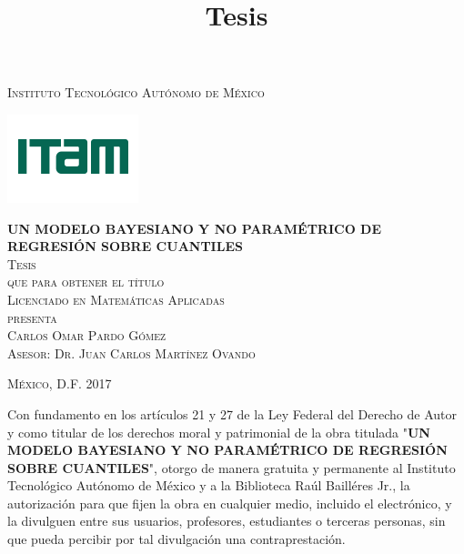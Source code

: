 \documentclass[letterpaper,onside,11pt,review]{report}
\begin{document}
\pagestyle{empty} %

\title{Tesis} %

\begin{titlepage}
\begin{center}

\textsc{\Large Instituto Tecnol\'ogico Aut\'onomo de M\'exico}\\[2em]

\begin{center}
	\includegraphics{DocumentosLaTex/ITAM_2016}
\end{center}

\vspace{1em}

{\sc \large {\bf UN MODELO BAYESIANO Y NO PARAM\'ETRICO DE REGRESI\'ON SOBRE CUANTILES}}\\[3em]

\textsc{\large Tesis}\\[1em]

\textsc{que para obtener el t\'itulo}\\[1em]

\textsc{Licenciado en Matem\'aticas Aplicadas}\\[1em]

\textsc{presenta}\\[1em]

\textsc{\Large Carlos Omar Pardo G\'omez}\\[1em]

\textsc{\large Asesor: Dr. Juan Carlos Mart\'inez Ovando}

\end{center}

\vspace*{\fill}
\textsc{M\'exico, D.F. \hspace*{\fill} 2017}

\end{titlepage}


\thispagestyle{empty}
\vspace*{\fill}
\begingroup
Con fundamento en los art\'iculos 21 y 27 de la Ley Federal del Derecho de Autor y como titular de los derechos moral y patrimonial de la obra titulada "\textbf{UN MODELO BAYESIANO Y NO PARAM\'ETRICO DE REGRESI\'ON SOBRE CUANTILES}", otorgo de manera gratuita y permanente al Instituto Tecnol\'ogico Aut\'onomo de M\'exico y a la Biblioteca Ra\'ul Baill\'eres Jr., la autorizaci\'on para que fijen la obra en cualquier medio, incluido el electr\'onico, y la divulguen entre sus usuarios, profesores, estudiantes o terceras personas, sin que pueda percibir por tal divulgaci\'on una contraprestaci\'on.
\end{document}

